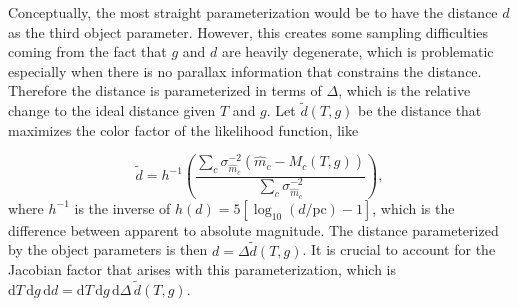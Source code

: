 \documentclass[fleqn,usenatbib]{mnras}
\newcommand{\Teff}{T}
\newcommand{\logg}{g}
\newcommand{\de}{\text{d}}
\begin{document}
Conceptually, the most straight parameterization would be to have the distance $d$ as the third object parameter. However, this creates some sampling difficulties coming from the fact that $\logg$ and $d$ are heavily degenerate, which is problematic especially when there is no parallax information that constrains the distance. Therefore the distance is parameterized in terms of $\Delta$, which is the relative change to the ideal distance given $\Teff$ and $\logg$. Let $\tilde{d}(\Teff,\logg)$ be the distance that maximizes the color factor of the likelihood function, like

\begin{equation}
	\tilde{d} = 
    h^{-1}\left( \frac{\sum_c \sigma_{\hat{m}_c}^{-2} (\hat{m}_c-M_c(\Teff,\logg))}{\sum_c \sigma_{\hat{m}_c}^{-2}} \right),
\end{equation}
where $h^{-1}$ is the inverse of $h(d)=5[\log_{10}(d/\text{pc})-1]$, which is the difference between apparent to absolute magnitude. The distance parameterized by the object parameters is then $d=\Delta\tilde{d}(\Teff,\logg)$. It is crucial to account for the Jacobian factor that arises with this parameterization, which is $\de \Teff\, \de \logg\, \de d = \de \Teff\, \de \logg\, \de \Delta\, \tilde{d}(\Teff,\logg)$.
\end{document}
